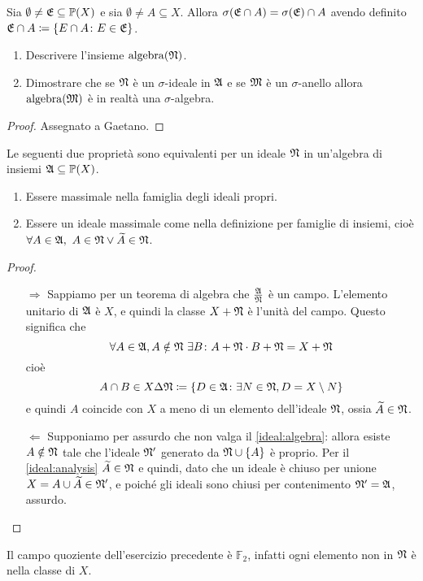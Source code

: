\documentclass[../EserciziIstituzioniAnalisi.tex]{subfiles}
\begin{document}
\begin{exercise}[2016-10-13]
Sia $\emptyset \neq \mathfrak E \subseteq \mathbb P(X)$ e sia $\emptyset \neq A \subseteq X$.
Allora $\sigma(\mathfrak E \cap A) = \sigma(\mathfrak E) \cap A$ avendo definito $\mathfrak E \cap A \coloneqq \left\lbrace E \cap A \colon E \in \mathfrak E\right\rbrace$.
\begin{enumerate}
\item Descrivere l'insieme $\operatorname{algebra}(\mathfrak N)$.
\item Dimostrare che se $\mathfrak N$ è un $\sigma$-ideale in $\mathfrak A$ e se $\mathfrak M$ è un $\sigma$-anello allora $\operatorname{algebra}(\mathfrak M)$ è in realtà una $\sigma$-algebra.
\end{enumerate}
\end{exercise}
\begin{proof}
Assegnato a Gaetano.
\end{proof}

\begin{exercise}[13/10/2016]
  Le seguenti due proprietà sono equivalenti per un ideale $\mathfrak N$ in un'algebra di insiemi $\mathfrak A \subseteq \mathbb P(X)$.
  \begin{enumerate}
    \item \label{ideal:algebra} Essere massimale nella famiglia degli ideali propri. 
    \item \label{ideal:analysis} Essere un ideale massimale come nella definizione per famiglie di insiemi, cioè $\forall A\in \mathfrak A,\ A\in\mathfrak N \lor \widetilde{A}\in\mathfrak N$.
  \end{enumerate}
\end{exercise}
\begin{proof}
  \begin{itemize}
    \item[$\Rightarrow$] Sappiamo per un teorema di algebra che $\frac{\mathfrak A}{\mathfrak N}$ è un campo. L'elemento unitario di $\mathfrak A$ è $X$, e quindi la classe $X+\mathfrak N$ è l'unità del campo.  
    Questo significa che
    \begin{equation*}
      \forall A \in \mathfrak A, A \notin \mathfrak N\ \exists B \colon A+\mathfrak N \cdot B+\mathfrak N = X+\mathfrak N
    \end{equation*}
    cioè
    \begin{equation*}
      A \cap B \in X \Delta \mathfrak N \coloneqq \{D\in \mathfrak A \colon \exists N\in \mathfrak N, D = X\setminus N \}
    \end{equation*}
    e quindi $A$ coincide con $X$ a meno di un elemento dell'ideale $\mathfrak N$, ossia $\widetilde{A}\in \mathfrak N$.
    
    \item[$\Leftarrow$] Supponiamo per assurdo che non valga il \cref{ideal:algebra}: allora esiste $A\notin \mathfrak N$ tale che l'ideale $\mathfrak N'$ generato da $\mathfrak N\cup \{A\}$ è proprio. Per il \cref{ideal:analysis} $\widetilde{A}\in \mathfrak N$ e quindi, dato che un ideale è chiuso per unione $X=A\cup\widetilde{A}\in \mathfrak N'$, e poiché gli ideali sono chiusi per contenimento $\mathfrak N'=\mathfrak A$, assurdo.
  \end{itemize}
\end{proof}
\begin{remark}
  Il campo quoziente dell'esercizio precedente è $\mathbb{F}_2$, infatti ogni elemento non in $\mathfrak N$ è nella classe di $X$.
\end{remark}
\end{document}
